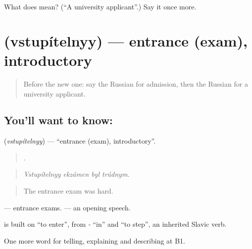 \begin{tcolorbox}[breakable,colback=teal!4,colframe=teal!35!black,title={Before you move on}]
What does  mean? (\textquotedblleft{}A university applicant\textquotedblright{}.) Say it once more.
\end{tcolorbox}
\section[\texorpdfstring{\ru{вступительный} (vstupítelnyy)}{вступительный (vstupítelnyy)}]{ (vstupítelnyy) — entrance (exam), introductory}

\label{lesson:RU-C383-vstupitelnyy}



\begin{quote}
Before the new one: say the Russian for admission, then the Russian for a university applicant.
\end{quote}

\subsection*{You'll want to know: }
\textbf{} (\emph{vstupítelnyy}) — \textquotedblleft{}entrance (exam), introductory\textquotedblright{}.

\begin{quote}
   .
\end{quote}

\begin{quote}
\emph{Vstupítelnyy ekzámen byl trúdnym.}
\end{quote}

\begin{quote}
The entrance exam was hard.
\end{quote}

\emph{ } — entrance exams. \emph{ } — an opening speech.

\begin{cousinweb}
\textbf{} is built on \emph{} \textquotedblleft{}to enter\textquotedblright{}, from \emph{-} \textquotedblleft{}in\textquotedblright{} and \emph{} \textquotedblleft{}to step\textquotedblright{}, an inherited Slavic verb.
\end{cousinweb}

\begin{grammarlens}[title={What you've built}]
One more word for telling, explaining and describing at B1.
\end{grammarlens}

